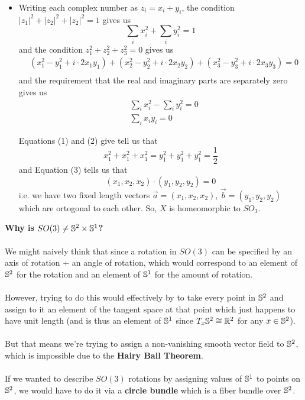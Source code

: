 \documentclass[11pt]{article}
\begin{document}
\begin{itemize}
  \item Writing each complex number as $z_i = x_i + y_i$, the condition $|z_1|^2 + |z_2|^2 + |z_2|^2 = 1$ gives us 
  \begin{equation}
    \sum_{i} x_i^2 + \sum_{i} y_i^2 = 1
  \end{equation}
  and the condition $z_1^2 + z_2^2 + z_3^2 = 0$ gives us 
  \begin{align*}
    &(x_1^2 - y_1^2 + i\cdot 2x_1y_1) + (x_2^2 - y_2^2 + i\cdot 2x_2y_2) + (x_3^2 - y_3^2 + i\cdot 2x_3y_3) = 0 \\
  \end{align*}
  and the requirement that the real and imaginary parts are separately zero gives us 
  \begin{align}
    &\sum_{i} x_i^2 - \sum_{i} y_i^2 = 0 \\
    &\sum_{i} x_i y_i = 0
  \end{align}
  
  Equations (1) and (2) give tell us that 
  \[ x_1^2 + x_1^2 + x_1^2 = y_1^2 + y_1^2 + y_1^2 = \frac{1}{2} \] and Equation (3) tells us that \[ \left(x_1, x_2, x_2\right) \cdot \left(y_1, y_2, y_2\right) = 0 \] i.e. we have two fixed length vectors $\vec{a} =  \left(x_1, x_2, x_2\right)$, $\vec{b} =  \left(y_1, y_2, y_2\right)$ which are ortogonal to each other. So, $X$ is homeomorphic to $SO_3$.
\end{itemize} 

\vskip 0.5cm
\begin{bluebox}
  \textbf{Why is $SO(3) \neq \mathbb{S}^2 \times \mathbb{S}^1$?}
  \\
  \\
  We might naively think that since a rotation in $SO(3)$ can be specified by an axis of rotation + an angle of rotation, which would correspond to an element of $\mathbb{S}^2$ for the rotation and an element of $\mathbb{S}^1$ for the amount of rotation.
  \\
  \\
  However, trying to do this would effectively by to take every point in $\mathbb{S}^2$ and assign to it an element of the tangent space at that point which just happens to have unit length (and is thus an element of $\mathbb{S}^1$ since $T_x \mathbb{S}^2 \cong \mathbb{R}^2$ for any $x \in \mathbb{S}^2$).
  \\
  \\
  But that means we're trying to assign a non-vanishing smooth vector field to $\mathbb{S}^2$, which is impossible due to the \textbf{Hairy Ball Theorem}.
  \\
  \\
  If we wanted to describe $SO(3)$ rotations by assigning values of $\mathbb{S}^1$ to points on $\mathbb{S}^2$, we would have to do it via a \textbf{circle bundle} which is a fiber bundle over $\mathbb{S}^2$.
\end{bluebox}
\end{document}
